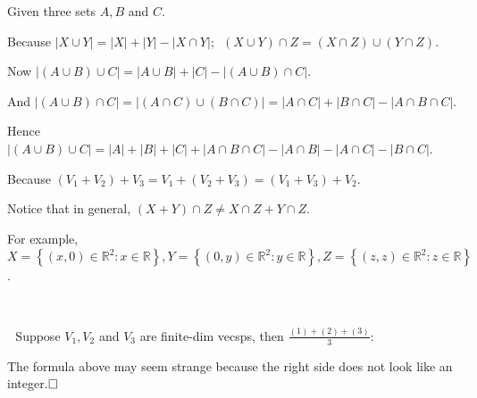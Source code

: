 \documentclass[a4paper, 11pt, UTF8]{article}
\newcommand{\Largesl}[1]{{\Large\tgsl#1}}
\def\Rbb{{\mathbb{R}}}
\def\BulletPoint{{\small\bullet}}
\begin{document}
\begin{large}
\par{}\; Given three sets $A,B$ and $C$.\par\quad
Because $\left|X\cup Y\right|=\left|X\right|+\left|Y\right|-\left|X\cap Y\right|;\,\,\,(X\cup Y)\cap Z=(X\cap Z)\cup(Y\cap Z)$.\par\quad
Now $\left|(A\cup B)\cup C\right|=\left|A\cup B\right|+\left|C\right|-\left|(A\cup B)\cap C\right|.$\par\quad
And $\left|(A\cup B)\cap C\right|=\left|(A\cap C)\cup(B\cap C)\right|=\left|A\cap C\right|+\left|B\cap C\right|-\left|A\cap B\cap C\right|.$\par\quad
Hence $\left|(A\cup B)\cup C\right|=\left| A\right|+\left|B\right|+\left|C\right|+\left|A\cap B\cap C\right|-\left| A\cap B\right|-\left| A\cap C\right|-\left| B\cap C\right|.$\par\vspace{12pt}\quad
Because $(V_1+V_2)+V_3=V_1+(V_2+V_3)=(V_1+V_3)+V_2$.\par\quad
{}\par\quad
Notice that in general, $(X+Y)\cap Z\neq X\cap Z+Y\cap Z$.\par\quad
For example, $X=\left\{(x,0)\in\Rbb^2:x\in\Rbb\right\},Y=\left\{(0,y)\in\Rbb^2:y\in\Rbb\right\},Z=\left\{(z,z)\in\Rbb^2:z\in\Rbb\right\}$.\par
{\,}\par
\BulletPoint \,\Corollary \,\,\,\Largesl{Suppose $V_1,V_2$ and $V_3$ are finite-dim vecsps, then} {\small $\displaystyle\frac{(1)+(2)+(3)}{3}:$
}\par
{}\par\quad
{\tgsl The formula above may seem strange because the right side does not look like an integer.$\hfill\square$}\par
\SepLine\vspace{8pt}\par


\end{large}
\end{document}
